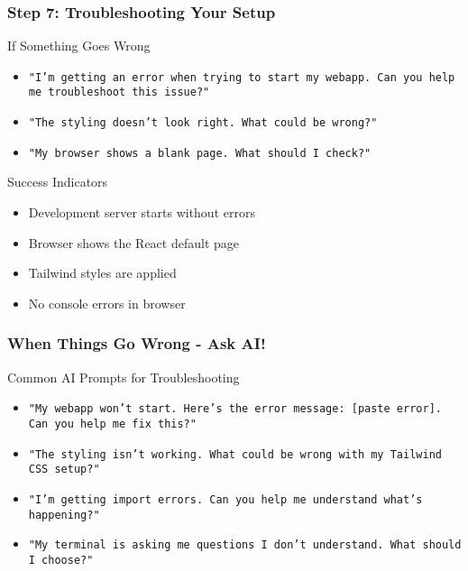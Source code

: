 \documentclass[aspectratio=169]{beamer}
\begin{document}
\begin{frame}
\frametitle{Step 7: Troubleshooting Your Setup}
\begin{alertblock}{If Something Goes Wrong}
\begin{itemize}
\item \texttt{"I'm getting an error when trying to start my webapp. Can you help me troubleshoot this issue?"}
\item \texttt{"The styling doesn't look right. What could be wrong?"}
\item \texttt{"My browser shows a blank page. What should I check?"}
\end{itemize}
\end{alertblock}

\begin{exampleblock}{Success Indicators}
\begin{itemize}
\item Development server starts without errors
\item Browser shows the React default page
\item Tailwind styles are applied
\item No console errors in browser
\end{itemize}
\end{exampleblock}
\end{frame}

\begin{frame}
\frametitle{When Things Go Wrong - Ask AI!}
\begin{alertblock}{Common AI Prompts for Troubleshooting}
\begin{itemize}
\item \texttt{"My webapp won't start. Here's the error message: [paste error]. Can you help me fix this?"}
\item \texttt{"The styling isn't working. What could be wrong with my Tailwind CSS setup?"}
\item \texttt{"I'm getting import errors. Can you help me understand what's happening?"}
\item \texttt{"My terminal is asking me questions I don't understand. What should I choose?"}
\end{itemize}
\end{alertblock}
\end{frame}
\end{document}
